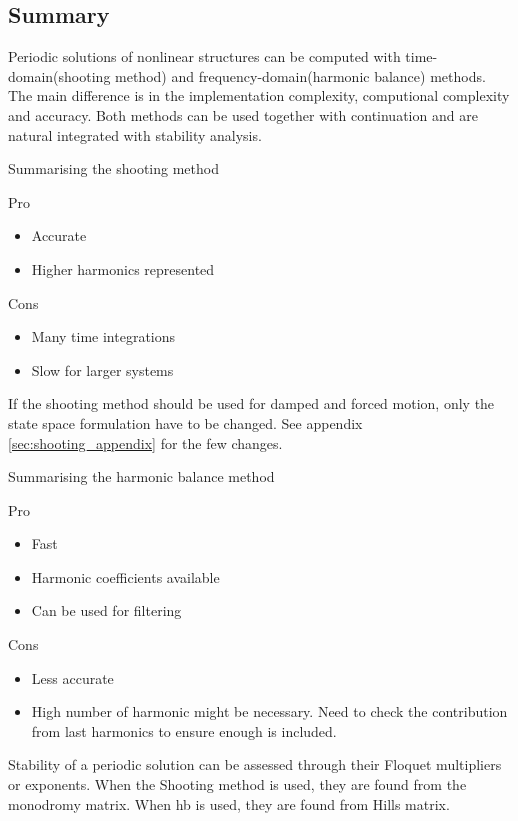\subsection{Summary}
\label{sec:per_summary}

Periodic solutions of nonlinear structures can be computed with
time-domain(shooting method) and frequency-domain(harmonic balance) methods. The
main difference is in the implementation complexity, computional complexity and
accuracy. Both methods can be used together with continuation and are natural
integrated with stability analysis.

Summarising the shooting method
\begin{multicols}{2}
  Pro
  \begin{itemize}
  \item Accurate
  \item Higher harmonics represented
  \end{itemize}
  \columnbreak
  Cons
  \begin{itemize}
  \item Many time integrations
  \item Slow for larger systems
  \end{itemize}
\end{multicols}
If the shooting method should be used for damped and forced motion, only the
state space formulation have to be changed. See appendix
\ref{sec:shooting_appendix} for the few changes.

Summarising the harmonic balance method
\begin{multicols}{2}
  Pro
  \begin{itemize}
  \item Fast
  \item Harmonic coefficients available
  \item Can be used for filtering
  \end{itemize}
  \columnbreak
  Cons
  \begin{itemize}
  \item Less accurate
  \item High number of harmonic might be necessary. Need to check the
    contribution from last harmonics to ensure enough is included.
  \end{itemize}
\end{multicols}


Stability of a periodic solution can be assessed through  their Floquet
multipliers or exponents. When the Shooting method is used, they are found from
the monodromy matrix. When \gls{hb} is used, they are found from Hills matrix.


